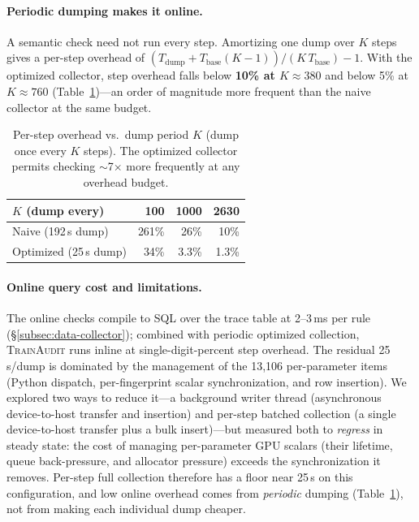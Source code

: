 \paragraph{Periodic dumping makes it online.} A semantic check need not run every step. Amortizing one dump over $K$ steps gives a per-step overhead of $(T_{\text{dump}} + T_{\text{base}}(K{-}1))/(K\,T_{\text{base}}) - 1$. With the optimized collector, step overhead falls below \textbf{10\% at $K\!\approx\!380$} and below 5\% at $K\!\approx\!760$ (Table~\ref{tab:amortize})---an order of magnitude more frequent than the naive collector at the same budget.

\begin{table}[t]
\centering\small
\caption{Per-step overhead vs.\ dump period $K$ (dump once every $K$ steps). The optimized collector permits checking $\sim$7$\times$ more frequently at any overhead budget.}
\label{tab:amortize}
\begin{tabular}{@{}lrrr@{}}
\toprule
$K$ (dump every) & 100 & 1000 & 2630 \\
\midrule
Naive (192\,s dump)      & 261\% & 26\% & 10\% \\
Optimized (25\,s dump)   & 34\%  & 3.3\% & 1.3\% \\
\bottomrule
\end{tabular}
\end{table}

\paragraph{Online query cost and limitations.} The online checks compile to SQL over the trace table at 2--3\,ms per rule (\S\ref{subsec:data-collector}); combined with periodic optimized collection, \textsc{TrainAudit} runs inline at single-digit-percent step overhead. The residual 25\,s/dump is dominated by the management of the 13{,}106 per-parameter items (Python dispatch, per-fingerprint scalar synchronization, and row insertion). We explored two ways to reduce it---a background writer thread (asynchronous device-to-host transfer and insertion) and per-step batched collection (a single device-to-host transfer plus a bulk insert)---but measured both to \emph{regress} in steady state: the cost of managing per-parameter GPU scalars (their lifetime, queue back-pressure, and allocator pressure) exceeds the synchronization it removes. Per-step full collection therefore has a floor near 25\,s on this configuration, and low online overhead comes from \emph{periodic} dumping (Table~\ref{tab:amortize}), not from making each individual dump cheaper.

